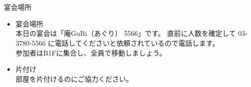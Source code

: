 \documentclass[cjk,dvipdfmx,12pt]{beamer}
\begin{document}
\section{}

\begin{frame}{宴会場所}

\begin{itemize}
 \item 宴会場所\\
       本日の宴会は「庵GuRi（あぐり） 5566」です。
       直前に人数を確定して 03-3780-5566 に電話してくださいと依頼されているので電話します。\\
       参加者はB1Fに集合し、全員で移動しましょう。
 \item 片付け\\
       部屋を片付けるのにご協力ください。
\end{itemize}

\end{frame}
\end{document}
